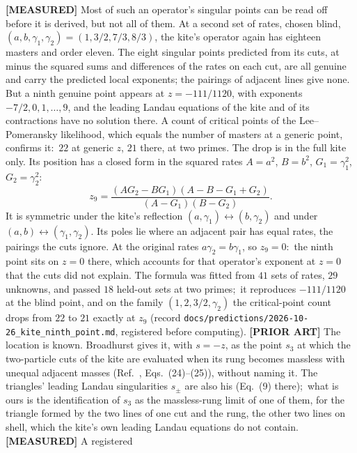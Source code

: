 \documentclass[aps,pra,twocolumn,superscriptaddress,longbibliography]{revtex4-2}
\begin{document}
\textbf{[MEASURED]} Most of such an operator's singular points can be read
off before it is derived, but not all of them.  At a second set of rates,
chosen blind, $(a,b,\gamma_1,\gamma_2)=(1,3/2,7/3,8/3)$, the kite's operator
again has eighteen masters and order eleven.  The eight singular points
predicted from its cuts, at minus the squared sums and differences of the
rates on each cut, are all genuine and carry the predicted local exponents;
the pairings of adjacent lines give none.  But a ninth genuine point appears
at $z=-111/1120$, with exponents $-7/2,0,1,\dots,9$, and the leading Landau
equations of the kite and of its contractions have no solution there.  A
count of critical points of the Lee--Pomeransky likelihood, which equals the
number of masters at a generic point, confirms it:\ $22$ at generic $z$, $21$
there, at two primes.  The drop is in the full kite only.  Its position has a closed form in the squared rates
$A=a^2$, $B=b^2$, $G_1=\gamma_1^2$, $G_2=\gamma_2^2$:
\begin{equation}
z_9=\frac{(AG_2-BG_1)(A-B-G_1+G_2)}{(A-G_1)(B-G_2)} .
\label{eq:kite_ninth_point}
\end{equation}
It is symmetric under the kite's reflection $(a,\gamma_1)\leftrightarrow
(b,\gamma_2)$ and under $(a,b)\leftrightarrow(\gamma_1,\gamma_2)$.  Its poles
lie where an adjacent pair has equal rates, the pairings the cuts ignore.  At
the original rates $a\gamma_2=b\gamma_1$, so $z_9=0$:\ the ninth point sits on
$z=0$ there, which accounts for that operator's exponent at $z=0$ that the
cuts did not explain.  The formula was fitted from $41$ sets of rates, $29$
unknowns, and passed $18$ held-out sets at two primes;\ it reproduces
$-111/1120$ at the blind point, and on the family $(1,2,3/2,\gamma_2)$ the
critical-point count drops from $22$ to $21$ exactly at $z_9$ (record
\texttt{docs/predictions/2026-10-26\_kite\_ninth\_point.md}, registered before
computing).  \textbf{[PRIOR ART]} The location is known.  Broadhurst gives
it, with $s=-z$, as the point $s_3$ at which the two-particle cuts of the kite
are evaluated when its rung becomes massless with unequal adjacent masses
(Ref.~\cite{broadhurst2022kites}, Eqs.~(24)--(25)), without naming it.  The
triangles' leading Landau singularities $s_\pm$ are also his (Eq.~(9) there);\
what is ours is the identification of $s_3$ as the massless-rung limit of one
of them, for the triangle formed by the two lines of one cut and the rung, the
other two lines on shell, which the kite's own leading Landau equations do
not contain.  \textbf{[MEASURED]} A registered
\end{document}
